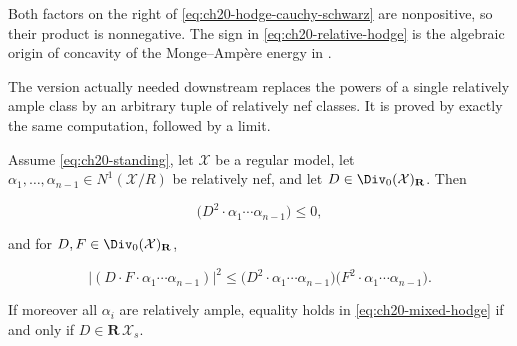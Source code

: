 Both factors on the right of \eqref{eq:ch20-hodge-cauchy-schwarz} are
nonpositive, so their product is nonnegative.  The sign in
\eqref{eq:ch20-relative-hodge} is the algebraic origin of concavity of the
Monge--Amp\`ere energy in .

The version actually needed downstream replaces the powers of a single
relatively ample class by an arbitrary tuple of relatively nef classes.  It
is proved by exactly the same computation, followed by a limit.

\begin{theorem}
\label{thm:ch20-mixed-hodge}
Assume \eqref{eq:ch20-standing}, let \(\mathcal X\) be a regular model, let
\(\alpha_1,\ldots,\alpha_{n-1}\in N^1(\mathcal X/R)\) be relatively nef, and
let \(D\in\Div_0(\mathcal X)_{\mathbf R}\).  Then

\begin{equation}
\label{eq:ch20-mixed-hodge}
 \bigl(D^2\cdot\alpha_1\cdots\alpha_{n-1}\bigr)\leq0 ,
\end{equation}

and for \(D,F\in\Div_0(\mathcal X)_{\mathbf R}\),

\begin{equation}
\label{eq:ch20-mixed-cauchy-schwarz}
 \bigl|(D\cdot F\cdot\alpha_1\cdots\alpha_{n-1})\bigr|^2
 \leq
 \bigl(D^2\cdot\alpha_1\cdots\alpha_{n-1}\bigr)
 \bigl(F^2\cdot\alpha_1\cdots\alpha_{n-1}\bigr).
\end{equation}

If moreover all \(\alpha_i\) are relatively ample, equality holds in
\eqref{eq:ch20-mixed-hodge} if and only if \(D\in\mathbf R\,\mathcal X_s\).
\end{theorem}

